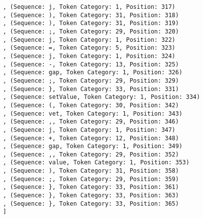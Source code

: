 \documentclass[a4paper, 12pt, article]{memoir}
\begin{document}
\begin{lstlisting}
, (Sequence: j, Token Category: 1, Position: 317)
, (Sequence: ), Token Category: 31, Position: 318)
, (Sequence: ), Token Category: 31, Position: 319)
, (Sequence: ;, Token Category: 29, Position: 320)
, (Sequence: j, Token Category: 1, Position: 322)
, (Sequence: =, Token Category: 5, Position: 323)
, (Sequence: j, Token Category: 1, Position: 324)
, (Sequence: -, Token Category: 13, Position: 325)
, (Sequence: gap, Token Category: 1, Position: 326)
, (Sequence: ;, Token Category: 29, Position: 329)
, (Sequence: }, Token Category: 33, Position: 331)
, (Sequence: setValue, Token Category: 1, Position: 334)
, (Sequence: (, Token Category: 30, Position: 342)
, (Sequence: vet, Token Category: 1, Position: 343)
, (Sequence: ,, Token Category: 29, Position: 346)
, (Sequence: j, Token Category: 1, Position: 347)
, (Sequence: +, Token Category: 12, Position: 348)
, (Sequence: gap, Token Category: 1, Position: 349)
, (Sequence: ,, Token Category: 29, Position: 352)
, (Sequence: value, Token Category: 1, Position: 353)
, (Sequence: ), Token Category: 31, Position: 358)
, (Sequence: ;, Token Category: 29, Position: 359)
, (Sequence: }, Token Category: 33, Position: 361)
, (Sequence: }, Token Category: 33, Position: 363)
, (Sequence: }, Token Category: 33, Position: 365)
]
\end{lstlisting}
\end{document}
